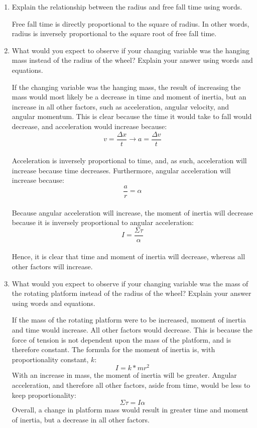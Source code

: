 \documentclass{article}
\begin{document}
\begin{enumerate}
    
\item Explain the relationship between the radius and free fall time using words.\\
\vspace{10pt}

Free fall time is directly proportional to the square of radius. In other words, radius is inversely proportional to the square root of free fall time.
\vspace{24pt}
\item What would you expect to observe if your changing variable was the hanging mass instead of the radius of the wheel? Explain your answer using words and equations.\\
\vspace{10pt}

If the changing variable was the hanging mass, the result of increasing the mass would most likely be a decrease in time and moment of inertia, but an increase in all other factors, such as acceleration, angular velocity, and angular momentum. This is clear because the time it would take to fall would decrease, and acceleration would increase because:\\
$$v = \frac{\Delta x}{t} \rightarrow a = \frac{\Delta v}{t}$$\\
Acceleration is inversely proportional to time, and, as such, acceleration will increase because time decreases. Furthermore, angular acceleration will increase because:\\
$$\frac{a}{r}=\alpha$$\\
Because angular acceleration will increase, the moment of inertia will decrease because it is inversely proportional to angular acceleration:\\
$$I = \frac{\Sigma \tau}{\alpha}$$\\
Hence, it is clear that time and moment of inertia will decrease, whereas all other factors will increase.
\vspace{24pt}



\item What would you expect to observe if your changing variable was the mass of the rotating platform instead of the radius of the wheel? Explain your answer using words and equations.

If the mass of the rotating platform were to be increased, moment of inertia and time would increase. All other factors would decrease. This is because the force of tension is not dependent upon the mass of the platform, and is therefore constant. The formula for the moment of inertia is, with proportionality constant, $k$:\\
$$I=k*mr^2$$
With an increase in mass, the moment of inertia will be greater. Angular acceleration, and therefore all other factors, aside from time, would be less to keep proportionality:
$$\Sigma \tau = I\alpha$$
Overall, a change in platform mass would result in greater time and moment of inertia, but a decrease in all other factors.

    
\end{enumerate}
    
\end{document}
